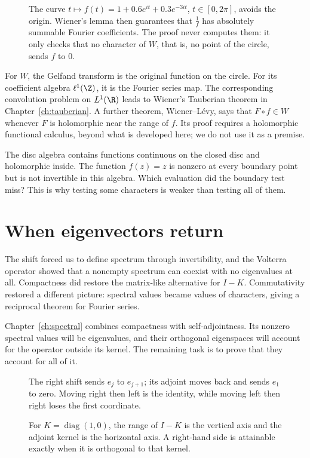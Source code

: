 \begin{figure}[ht]
\centering
{}
\caption{The curve $t\mapsto f(t)=1+0.6e^{it}+0.3e^{-3it}$, $t\in[0,2\pi]$, avoids the origin. Wiener's lemma then guarantees that $\frac1f$ has absolutely summable Fourier coefficients. The proof never computes them: it only checks
that no character of $W$, that is, no point of the circle, sends $f$ to $0$.}
\label{fig:wiener}
\end{figure}

For $W$, the Gelfand transform is the original function on the circle. For its coefficient algebra $\ell^1(\Z)$, it is the Fourier series map. The corresponding convolution problem on $L^1(\R)$ leads to Wiener's Tauberian theorem in Chapter~\ref{ch:tauberian}. A further theorem, Wiener--L\'evy, says that $F\circ f\in W$ whenever $F$ is holomorphic near the range of $f$. Its proof requires a holomorphic functional calculus, beyond what is developed here; we do not use it as a premise.

\begin{think}
The disc algebra contains functions continuous on the closed disc and holomorphic inside. The function $f(z)=z$ is nonzero at every boundary point but is not invertible in this algebra. Which evaluation did the boundary test miss? This is why testing some characters is weaker than testing all of them.
\end{think}

\section{When eigenvectors return}

The shift forced us to define spectrum through invertibility, and the Volterra operator showed that a nonempty spectrum can coexist with no eigenvalues at all. Compactness did restore the matrix-like alternative for $I-K$. Commutativity restored a different picture: spectral values became values of characters, giving a reciprocal theorem for Fourier series.

Chapter~\ref{ch:spectral} combines compactness with self-adjointness. Its nonzero spectral values will be eigenvalues, and their orthogonal eigenspaces will account for the operator outside its kernel. The remaining task is to prove that they account for all of it.

\begin{figure}[ht]
\centering{}
\caption{The right shift sends $e_j$ to $e_{j+1}$; its adjoint moves back and sends $e_1$ to zero. Moving right then left is the identity, while moving left then right loses the first coordinate.}
\label{fig:v8c08shift}
\end{figure}
\begin{figure}[ht]
\centering{}
\caption{For $K=\operatorname{diag}(1,0)$, the range of $I-K$ is the vertical axis and the adjoint kernel is the horizontal axis. A right-hand side is attainable exactly when it is orthogonal to that kernel.}
\label{fig:v8c08fredholm}
\end{figure}

